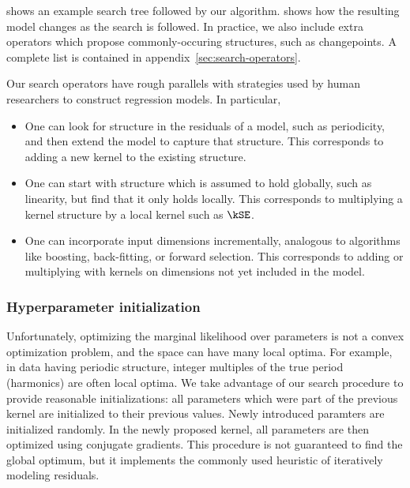  shows an example search tree followed by our algorithm.
 shows how the resulting model changes as the search is followed.
In practice, we also include extra operators which propose commonly-occuring structures, such as changepoints.
A complete list is contained in appendix~\ref{sec:search-operators}.

Our search operators have rough parallels with strategies used by human researchers to construct regression models.
In particular,
\begin{itemize}
\item One can look for structure in the residuals of a model, such as periodicity, and then extend the model to capture that structure.
This corresponds to adding a new kernel to the existing structure.
\item One can start with structure which is assumed to hold globally, such as linearity, but find that it only holds locally.
This corresponds to multiplying a kernel structure by a local kernel such as $\kSE$.
\item One can incorporate input dimensions incrementally, analogous to algorithms like boosting, back-fitting, or forward selection.
This corresponds to adding or multiplying with kernels on dimensions not yet included in the model.
\end{itemize}





\subsubsection{Hyperparameter initialization}

Unfortunately, optimizing the marginal likelihood over parameters is not a convex optimization problem, and the space can have many local optima.
For example, in data having periodic structure, integer multiples of the true period (harmonics) are often local optima. 
We take advantage of our search procedure to provide reasonable initializations: all parameters which were part of the previous kernel are initialized to their previous values. Newly introduced paramters are initialized randomly.
In the newly proposed kernel, all parameters are then optimized using conjugate gradients.
This procedure is not guaranteed to find the global optimum, but it implements the commonly used heuristic of iteratively modeling residuals.






